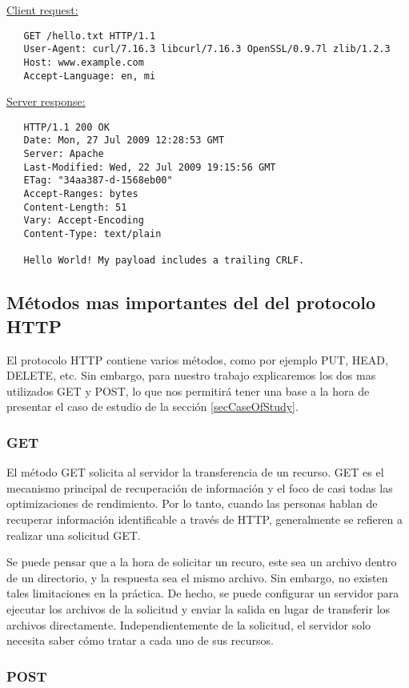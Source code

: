 \bigskip
\noindent
\underline{Client request:}
\begin{verbatim}
   GET /hello.txt HTTP/1.1
   User-Agent: curl/7.16.3 libcurl/7.16.3 OpenSSL/0.9.7l zlib/1.2.3
   Host: www.example.com
   Accept-Language: en, mi
  \end{verbatim}
\underline{Server response:}
\begin{verbatim}
   HTTP/1.1 200 OK
   Date: Mon, 27 Jul 2009 12:28:53 GMT
   Server: Apache
   Last-Modified: Wed, 22 Jul 2009 19:15:56 GMT
   ETag: "34aa387-d-1568eb00"
   Accept-Ranges: bytes
   Content-Length: 51
   Vary: Accept-Encoding
   Content-Type: text/plain

   Hello World! My payload includes a trailing CRLF.
\end{verbatim}


\subsection{Métodos mas importantes del del protocolo HTTP}

El protocolo HTTP contiene varios métodos, como por ejemplo PUT, HEAD, DELETE, etc. Sin
embargo, para nuestro trabajo explicaremos los dos mas utilizados GET y POST, lo que
nos permitirá tener una base a la hora de presentar el caso de estudio de la 
sección \ref{secCaseOfStudy}.


\subsubsection*{GET}

El método GET solicita al servidor la transferencia de un recurso.
GET es el mecanismo principal de recuperación de información y el 
foco de casi todas las optimizaciones de rendimiento. Por lo tanto,
cuando las personas hablan de recuperar información identificable
a través de HTTP, generalmente se refieren a realizar una solicitud
GET.

Se puede pensar que a la hora de solicitar un recuro, este sea un archivo 
dentro de un directorio, y la respuesta sea el mismo archivo. Sin embargo, 
no existen tales limitaciones en la práctica. De hecho, se puede 
configurar un servidor para ejecutar los archivos de la solicitud y 
enviar la salida en lugar de transferir los archivos directamente. 
Independientemente de la solicitud, el servidor solo necesita saber 
cómo tratar a cada uno de sus recursos.

\subsubsection*{POST}

